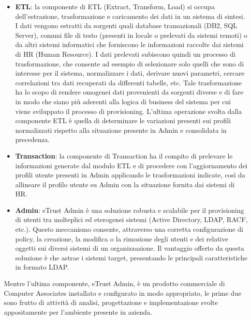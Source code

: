 \begin{itemize}
\item \textbf{ETL}: la componente di ETL (Extract, Transform, Load) si occupa
dell’estrazione, trasformazione e caricamento dei dati in un sistema di sintesi.
I dati vengono estratti da sorgenti quali database transazionali (DB2, SQL
Server), comuni file di testo (presenti in locale o prelevati da sistemi remoti)
o da altri sistemi informatici che forniscono le informazioni raccolte dai
sistemi di HR (Human Resource).
I dati prelevati subiscono quindi un processo di trasformazione, che consente ad
esempio di selezionare solo quelli che sono di interesse per il sistema,
normalizzare i dati, derivare nuovi parametri, cercare correlazioni tra
dati recuperati da differenti tabelle, etc.
Tale trasformazione ha lo scopo di rendere omogenei dati provenienti da sorgenti
diverse e di fare in modo che siano più aderenti alla logica di business del
sistema per cui viene sviluppato il processo di provisioning. 
L’ultima operazione svolta dalla componente ETL è quella di determinare le
variazioni presenti sui profili normalizzati rispetto alla situazione presente
in Admin e consolidata in precedenza. 

\item \textbf{Transaction}: la componente di Transaction ha il compito di prelevare le
informazioni generate dal modulo ETL e di procedere con l’aggiornamento dei profili
utente presenti in Admin applicando le trasformazioni indicate, così da
allineare il profilo utente su Admin con la situazione fornita dai sistemi di
HR.

\item \textbf{Admin}: eTrust Admin è una soluzione robusta e scalabile per il
provisioning di utenti tra molteplici ed eterogenei sistemi (Active
Directory, LDAP, RACF, etc.). Questo meccanismo consente, attraverso una corretta
configurazione di policy, la creazione, la modifica o la rimozione degli utenti
e dei relative oggetti sui diversi sistemi di un organizzazione.
Il vantaggio offerto da questa soluzione è che astrae i sistemi target,
presentando le principali caratteristiche in formato LDAP.
\end{itemize}
  
Mentre l’ultima componente, eTrust Admin, è un prodotto commerciale di
Computer Associates installato e configurato in modo appropriato, le prime due
sono frutto di attività di analisi, progettazione e implementazione svolte
appositamente per l’ambiente presente in azienda.

